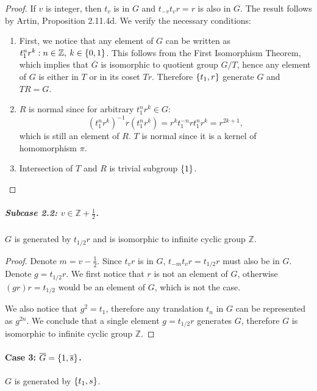\documentclass{article}
\theoremstyle{definition}
\newcommand{\Z}{\mathbb{Z}}
\DeclarePairedDelimiter\set{\{}{\}}
\begin{document}
\begin{proof}

If $v$ is integer, then $t_v$ is in $G$ and $t_{-v} t_v r = r$ is also in $G$.
The result follows by Artin, Proposition 2.11.4d.
We verify the necessary conditions:

\begin{enumerate}

    \item First, we notice that any element of $G$ can be written as $t_1^n r^k : n \in \Z, \> k \in \set{0,1}$.
    This follows from the First Isomorphism Theorem, which implies that $\overline{G}$ is isomorphic to quotient group $G/T$, hence any element of $G$ is either in $T$ or in its coset $Tr$.
    Therefore $\set{t_1,r}$ generate $G$ and $TR = G$.
    
    \item $R$ is normal since for arbitrary $t_1^n r^k \in G$:
    \[
        (t_1^n r^k)^{-1} r (t_1^n r^k) 
        = r^k t_1^{-n} r t_1^{n} r^k
        = r^{2k+1},
    \]
    which is still an element of $R$.
    $T$ is normal since it is a kernel of homomorphism $\pi$.
    
    \item Intersection of $T$ and $R$ is trivial subgroup $\set{1}$.

\end{enumerate}

\end{proof}

\subparagraph{Subcase 2.2: $v \in \Z + \frac{1}{2}$.}
$G$ is generated by $t_{1/2}r$ and is isomorphic to infinite cyclic group $\Z$.

\begin{proof}

Denote $m = v - \frac{1}{2}$.
Since $t_v r$ is in $G$, $t_{-m} t_v r = t_{1/2} r$ must also be in $G$.
Denote $g = t_{1/2} r$.
We first notice that $r$ is not an element of $G$, otherwise $(g r)r = t_{1/2}$ would be an element of $G$, which is not the case.

We also notice that $g^2 = t_1$, therefore any translation $t_n$ in $G$ can be represented as $g^{2n}$.
We conclude that a single element $g = t_{1/2} r$ generates $G$, therefore $G$ is isomorphic to infinite cyclic group $\Z$.

\end{proof}

\paragraph{Case 3: $\overline{G} = \set{1, \overline{s}}$.}
$G$ is generated by $\set{t_1, s}$.
\end{document}
